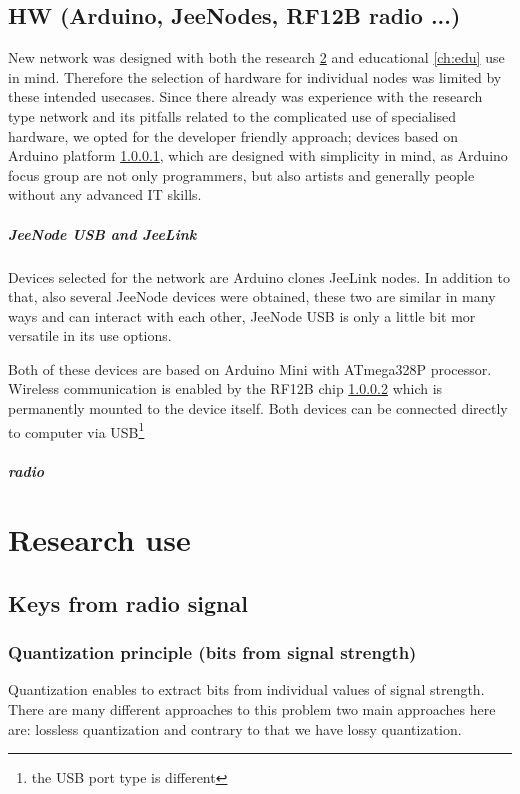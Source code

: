 \documentclass[
  digital, %
  table,   %
  nolof,     %
  nolot,     %
           oneside
]{fithesis3}
\begin{document}
  \section{HW (Arduino, JeeNodes, RF12B radio ...)}\label{sec:hw}
  New network was designed with both the research \ref{ch:research} and educational \ref{ch:edu} use in mind. Therefore the selection of hardware for individual nodes was limited by these intended usecases. Since there already was experience with the research type network %
  and its pitfalls related to the complicated use of specialised hardware, we opted for the developer friendly approach; devices based on Arduino platform \ref{par:jeeLink}, which are designed with simplicity in mind, as Arduino focus group are not only programmers, but also artists and generally people without any advanced IT skills.

  \paragraph{JeeNode USB and JeeLink}\label{par:jeeLink} %
  Devices selected for the network are Arduino clones JeeLink nodes. In addition to that, also several JeeNode devices were obtained, these two are similar in many ways and can interact with each other, JeeNode USB is only a little bit mor versatile in its use options.

  Both of these devices are based on Arduino Mini %
  with ATmega328P processor. Wireless communication is enabled by the RF12B chip \ref{par:radio} %
  which is permanently mounted to the device itself. Both devices can be connected directly to computer via USB\footnote{the USB port type is different}
  \paragraph{radio}\label{par:radio} %


  \chapter{Research use}\label{ch:research}
  \section{Keys from radio signal}
    \subsection{Quantization principle (bits from signal strength)}
    Quantization enables to extract bits from individual values of signal strength. There are many different approaches to this problem %
    two main approaches here are: lossless quantization %
    and contrary to that we have lossy quantization.
\end{document}
